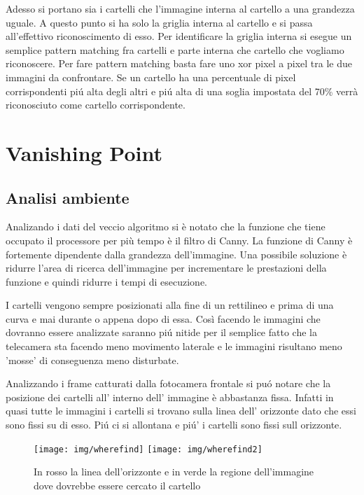 		Adesso si portano sia i cartelli che l'immagine interna al cartello a una grandezza uguale. A questo punto si ha solo la griglia interna al cartello e si passa all'effettivo riconoscimento di esso. Per identificare la griglia interna si esegue un semplice pattern matching fra cartelli e parte interna che cartello che vogliamo riconoscere. Per fare pattern matching basta fare uno xor pixel a pixel tra le due immagini da confrontare. Se un cartello ha una percentuale di pixel corrispondenti pi\'u alta degli altri e pi\'u alta di una soglia impostata del 70\% verrà riconosciuto come cartello corrispondente.
		

\section{Vanishing Point}

	\subsection{Analisi ambiente}

		Analizando i dati del veccio algoritmo si è notato che la funzione che tiene occupato il processore per più tempo è il filtro di Canny. La funzione di Canny è fortemente dipendente dalla grandezza dell'immagine. Una possibile soluzione è ridurre l'area di ricerca dell'immagine per incrementare le prestazioni della funzione e quindi ridurre i tempi di esecuzione.

		I cartelli vengono sempre posizionati alla fine di un rettilineo e prima di una curva e mai durante o appena dopo di essa. Così facendo le immagini che dovranno essere analizzate saranno pi\'u nitide per il semplice fatto che la telecamera sta facendo meno movimento laterale e le immagini risultano meno 'mosse' di conseguenza meno disturbate.

		Analizzando i frame catturati dalla fotocamera frontale si pu\'o notare che la posizione dei cartelli all' interno dell' immagine è abbastanza fissa. Infatti in quasi tutte le immagini i cartelli si trovano sulla linea dell' orizzonte dato che essi sono fissi su di esso. Pi\'u ci si allontana e pi\'u' i cartelli sono fissi sull orizzonte.
		\begin{figure}[!ht]
			\centering
			\texttt{[image: img/wherefind]}
			\texttt{[image: img/wherefind2]}
			\caption[Area ricerca cartello]{In rosso la linea dell'orizzonte e in verde la regione dell'immagine dove dovrebbe essere cercato il cartello}
		\end{figure}



